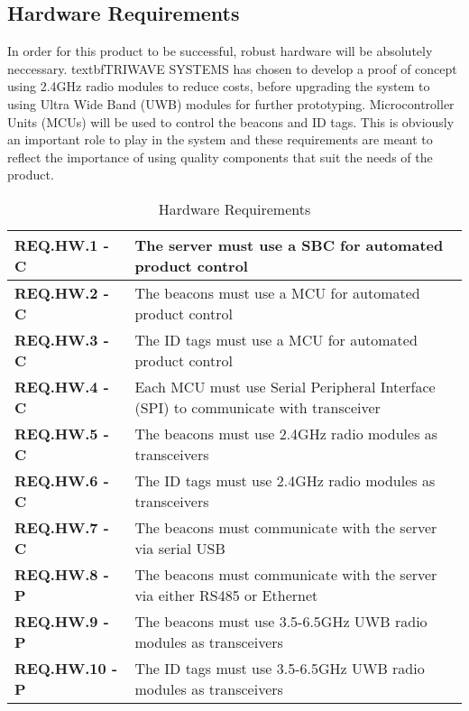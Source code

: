 \documentclass[11pt]{article}
\begin{document}
\subsection{Hardware Requirements}
In order for this product to be successful, robust hardware will be absolutely neccessary.  textbf{TRIWAVE SYSTEMS} has chosen to develop a proof of concept using 2.4GHz radio modules to reduce costs, before upgrading the system to using Ultra Wide Band (UWB) modules for further prototyping. Microcontroller Units (MCUs) will be used to control the beacons and ID tags. This is obviously an important role to play in the system and these requirements are meant to reflect the importance of using quality components that suit the needs of the product.
\bgroup
\def\arraystretch{1.5}
\begin{table}[H]
\centering
\begin{tabular}{ | m{3.5cm} | m{12.5cm} | } 
 \hline
 \textbf{ REQ.HW.1 - C } & The server must use a SBC for automated product control \\ 
\hline
 \textbf{ REQ.HW.2 - C } & The beacons must use a MCU for automated product control \\ 
\hline
 \textbf{ REQ.HW.3 - C } & The ID tags must use a MCU for automated product control \\ 
\hline
 \textbf{ REQ.HW.4 - C} & Each MCU must use Serial Peripheral Interface (SPI) to communicate with transceiver \\
\hline
 \textbf{ REQ.HW.5 - C } & The beacons must use 2.4GHz radio modules as transceivers \\
\hline
 \textbf{ REQ.HW.6 - C } & The ID tags must use 2.4GHz radio modules as transceivers  \\
\hline
 \textbf{ REQ.HW.7 - C } & The beacons must communicate with the server via serial  USB \\
\hline
 \textbf{ REQ.HW.8 - P } &The beacons must communicate with the server via either RS485 or Ethernet  \\
\hline
 \textbf{ REQ.HW.9 - P } & The beacons must use 3.5-6.5GHz UWB radio modules as transceivers \\
\hline
 \textbf{ REQ.HW.10 - P } & The ID tags must use 3.5-6.5GHz UWB radio modules as transceivers \\
\hline
\end{tabular}
\caption{Hardware Requirements}
\end{table}	

\break
\end{document}

